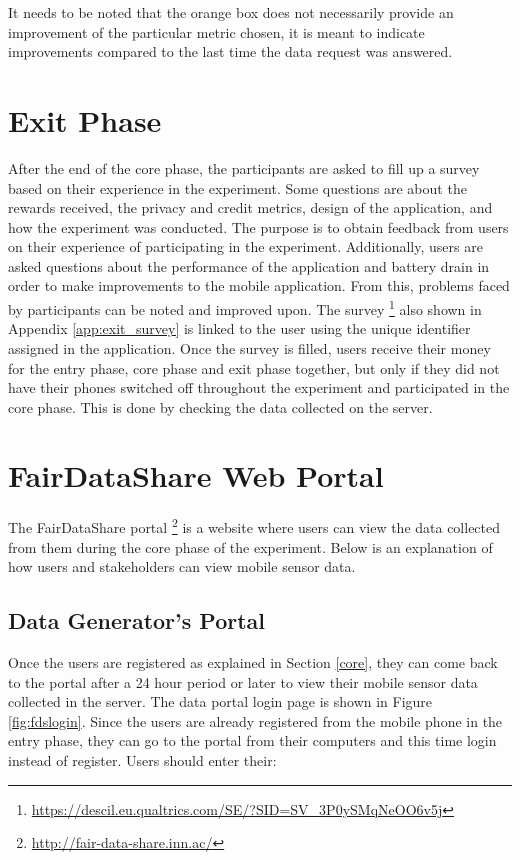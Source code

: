 It needs to be noted that the orange box does not necessarily provide an improvement of the particular metric chosen, it is meant to indicate improvements compared to the last time the data request was answered.


\section{Exit Phase}

After the end of the core phase, the participants are asked to fill up a survey based on their experience in the experiment. Some questions are
about the rewards received, the privacy and credit metrics, design of the application, and how the experiment was conducted. The purpose is to obtain feedback from users on their experience of participating in the experiment. Additionally, users are asked questions about the performance of the application and battery drain in order to make improvements to the mobile application. From this, problems faced by participants can be noted and improved upon. The survey \footnote{\url{https://descil.eu.qualtrics.com/SE/?SID=SV_3P0ySMqNeOO6v5j}} also shown in Appendix \ref{app:exit_survey} is linked to the user using the unique identifier assigned in the application. Once the survey is filled, users receive their money for the entry phase, core phase and exit phase together, but only if they did not have their phones switched off throughout the experiment and participated in the core phase. This is done by checking the data collected on the server. 

\section{FairDataShare Web Portal} \label{fds}

The FairDataShare portal \footnote{\url{http://fair-data-share.inn.ac/}} is a website where users can view the data collected from them during the core phase of the experiment. Below is an explanation of how users and stakeholders can view mobile sensor data.

\subsection{Data Generator's Portal}

Once the users are registered as explained in Section \ref{core}, they can come back to the portal after a 24 hour period or later to view their mobile sensor data collected in the server. The data portal login page is shown in Figure \ref{fig:fdslogin}. Since the users are already registered from the mobile phone in the entry phase, they can go to the portal from their computers and this time login instead of register. Users should enter their: 

